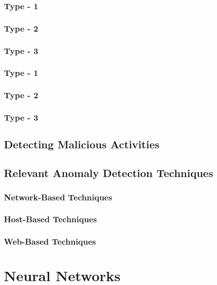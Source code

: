 \documentclass[12pt]{article}
\theoremstyle{definition}
\begin{document}
			\subsubsection{Type - 1}
			\lipsum[1-2]
			\subsubsection{Type - 2}
			\lipsum[1-2]
			\subsubsection{Type - 3}
			\lipsum[1-2]
			\subsubsection{Type - 1}
			\lipsum[1-2]
			\subsubsection{Type - 2}
			\lipsum[1-2]
			\subsubsection{Type - 3}
			\lipsum[1-2]		
		\subsection{Detecting Malicious Activities}
		\lipsum[1-2]
		
		\subsection{Relevant Anomaly Detection Techniques}
		\lipsum[1-2]
			\subsubsection{Network-Based Techniques}
			\lipsum[1-2]
			\subsubsection{Host-Based Techniques}
			\lipsum[1-2]
			\subsubsection{Web-Based Techniques}
			\lipsum[1-2]
	
	\cleardoublepage
	\section{Neural Networks}\label{sec:neural-networks}
	\lipsum[1]
\end{document}
